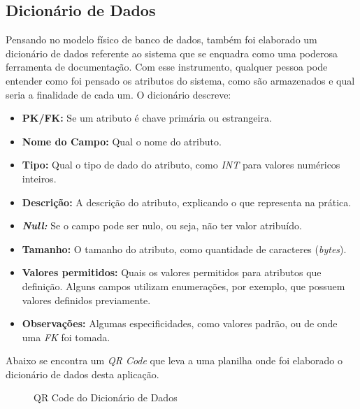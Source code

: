 \subsection{Dicionário de Dados}
Pensando no modelo físico de banco de dados, também foi elaborado um dicionário de dados referente ao sistema que se enquadra como uma poderosa ferramenta de documentação. Com esse instrumento, qualquer pessoa pode entender como foi pensado os atributos do sistema, como são armazenados e qual seria a finalidade de cada um.
O dicionário descreve:
\begin{itemize}
	\item \textbf{PK/FK:} Se um atributo é chave primária ou estrangeira.
	\item \textbf{Nome do Campo:} Qual o nome do atributo.
	\item \textbf{Tipo:} Qual o tipo de dado do atributo, como \textit{INT} para valores numéricos inteiros.
	\item \textbf{Descrição:} A descrição do atributo, explicando o que representa na prática.
	\item \textbf{\textit{Null:}} Se o campo pode ser nulo, ou seja, não ter valor atribuído.
	\item \textbf{Tamanho:} O tamanho do atributo, como quantidade de caracteres (\textit{bytes}).
	\item \textbf{Valores permitidos:} Quais os valores permitidos para atributos que definição. Alguns campos utilizam enumerações, por exemplo, que possuem valores definidos previamente.
	\item \textbf{Observações:} Algumas especificidades, como valores padrão, ou de onde uma \textit{FK} foi tomada.
\end{itemize}
Abaixo se encontra um \textit{QR Code} que leva a uma planilha onde foi elaborado o dicionário de dados desta aplicação.
\begin{figure}[h]
	\centering
	\caption{QR Code do Dicionário de Dados}
	\label{fig:qrcode-dicionario-de-dados}
\end{figure}





